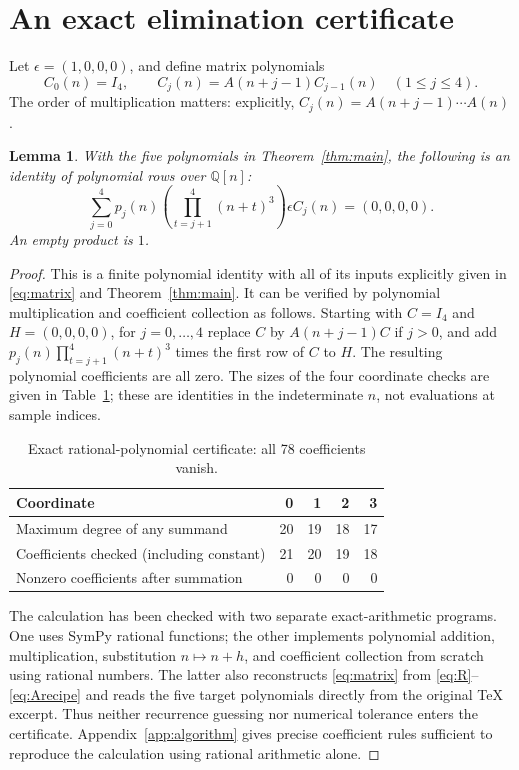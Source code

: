 \documentclass[11pt]{article}
\newtheorem{lemma}[theorem]{Lemma}
\newcommand{\Q}{\mathbb Q}
\begin{document}
\section{An exact elimination certificate}
Let $\epsilon=(1,0,0,0)$, and define matrix polynomials
\[
 C_0(n)=I_4,\qquad C_j(n)=A(n+j-1)C_{j-1}(n)\quad(1\leq j\leq4).
\]
The order of multiplication matters: explicitly,
$C_j(n)=A(n+j-1)\cdots A(n)$.

\begin{lemma}\label{lem:certificate}
With the five polynomials in Theorem~\ref{thm:main}, the following is
an identity of polynomial rows over $\Q[n]$:
\begin{equation}\label{eq:certificate}
 \boxed{\quad
 \sum_{j=0}^4 p_j(n)\left(\prod_{t=j+1}^{4}(n+t)^3\right)
                      \epsilon C_j(n)=(0,0,0,0).
 \quad}
\end{equation}
An empty product is $1$.
\end{lemma}
\begin{proof}
This is a finite polynomial identity with all of its inputs explicitly
given in \eqref{eq:matrix} and Theorem~\ref{thm:main}. It can be verified
by polynomial multiplication and coefficient collection as follows.
Starting with $C=I_4$ and $H=(0,0,0,0)$, for $j=0,\ldots,4$ replace
$C$ by $A(n+j-1)C$ if $j>0$, and add
$p_j(n)\prod_{t=j+1}^4(n+t)^3$ times the first row of $C$ to $H$.
The resulting polynomial coefficients are all zero. The sizes of the
four coordinate checks are given in Table~\ref{tab:certificate}; these
are identities in the indeterminate $n$, not evaluations at sample indices.

\begin{table}[H]
\centering
\begin{tabular}{lrrrr}
\toprule
Coordinate & 0 & 1 & 2 & 3\\
\midrule
Maximum degree of any summand &20&19&18&17\\
Coefficients checked (including constant)&21&20&19&18\\
Nonzero coefficients after summation&0&0&0&0\\
\bottomrule
\end{tabular}
\caption{Exact rational-polynomial certificate: all 78 coefficients vanish.}
\label{tab:certificate}
\end{table}

The calculation has been checked with two separate exact-arithmetic
programs. One uses SymPy rational functions; the other implements
polynomial addition, multiplication, substitution $n\mapsto n+h$, and
coefficient collection from scratch using rational numbers. The latter
also reconstructs \eqref{eq:matrix} from \eqref{eq:R}--\eqref{eq:Arecipe}
and reads the five target polynomials directly from the original TeX
excerpt. Thus neither recurrence guessing nor numerical tolerance enters
the certificate. Appendix~\ref{app:algorithm} gives precise coefficient
rules sufficient to reproduce the calculation using rational arithmetic alone.
\end{proof}
\end{document}

